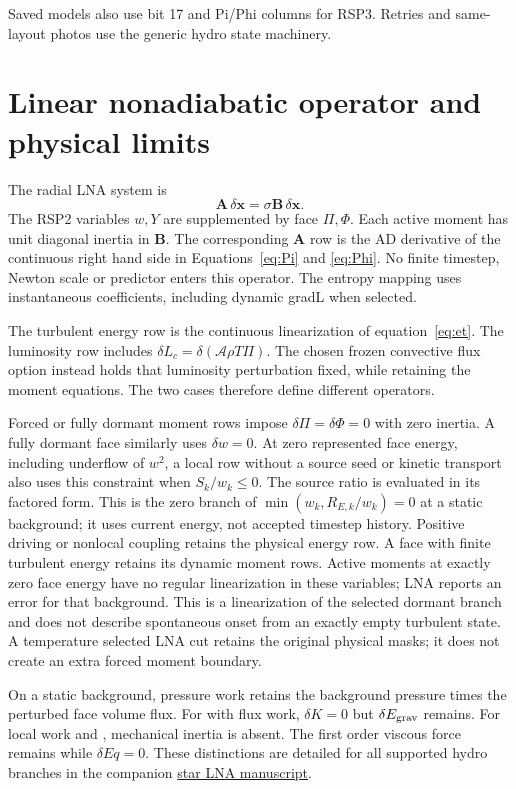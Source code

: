 \documentclass[11pt]{article}
\newcommand{\code}[1]{\texttt{\detokenize{#1}}}
\newcommand{\area}{\mathcal A}
\numberwithin{equation}{section}
\begin{document}
Saved models also use bit 17 and Pi/Phi columns for RSP3.
Retries and same-layout photos use the generic hydro state machinery.

\section{Linear nonadiabatic operator and physical limits}
The radial LNA system is
\begin{equation}
 \mathbf A\,\delta\mathbf x=\sigma\mathbf B\,\delta\mathbf x .
\end{equation}
The RSP2 variables $w,Y$ are supplemented by face $\Pi,\Phi$.
Each active moment has unit diagonal inertia in $\mathbf B$.
The corresponding $\mathbf A$ row is the AD derivative of the continuous
right hand side in Equations~\eqref{eq:Pi} and \eqref{eq:Phi}.
No finite timestep, Newton scale or predictor enters this operator.
The entropy mapping uses instantaneous coefficients, including dynamic
gradL when selected.

The turbulent energy row is the continuous linearization of equation~\eqref{eq:et}.
The luminosity row includes $\delta L_c=\delta(\area\rho T\Pi)$.
The chosen frozen convective flux option instead holds that luminosity
perturbation fixed, while retaining the moment equations.
The two cases therefore define different operators.

Forced or fully dormant moment rows impose
$\delta\Pi=\delta\Phi=0$ with zero inertia.
A fully dormant face similarly uses $\delta w=0$. At zero represented
face energy, including underflow of $w^2$, a local row without a source
seed or kinetic transport also uses this constraint when
$S_k/w_k\leq0$. The source ratio is evaluated in its factored form.
This is the zero branch of $\min(w_k,R_{E,k}/w_k)=0$ at a static background;
it uses current energy, not accepted timestep history.
Positive driving or nonlocal coupling retains the physical energy row.
A face with finite turbulent energy retains its dynamic moment rows.
Active moments at exactly zero face energy have no regular linearization
in these variables; LNA reports an error for that background.
This is a linearization of the selected dormant branch and does not
describe spontaneous onset from an exactly empty turbulent state.
A temperature selected LNA cut retains the original physical masks;
it does not create an extra forced moment boundary.

On a static background, pressure work retains the background pressure times
the perturbed face volume flux. For \code{dedt} with flux work,
$\delta K=0$ but $\delta E_{\rm grav}$ remains.
For local work and \code{eps_grav}, mechanical inertia is absent.
The first order viscous force remains while $\delta Eq=0$.
These distinctions are detailed for all supported hydro branches in the
companion \href{star_LNA_manuscript.pdf}{star LNA manuscript}.
\end{document}
